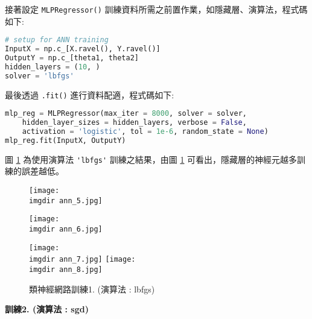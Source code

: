 接著設定 \verb|MLPRegressor()| 訓練資料所需之前置作業，如隱藏層、演算法，程式碼如下:
\bigskip
\begin{lstlisting}[language = Python]
# setup for ANN training
InputX = np.c_[X.ravel(), Y.ravel()]
OutputY = np.c_[theta1, theta2]
hidden_layers = (10, )
solver = 'lbfgs' 
\end{lstlisting}

最後透過 \verb|.fit()| 進行資料配適，程式碼如下:
\bigskip
\begin{lstlisting}[language = Python]
mlp_reg = MLPRegressor(max_iter = 8000, solver = solver,
    hidden_layer_sizes = hidden_layers, verbose = False,
    activation = 'logistic', tol = 1e-6, random_state = None)
mlp_reg.fit(InputX, OutputY)
\end{lstlisting}

圖 \ref{fig:ann_5} 為使用演算法 \verb|'lbfgs'| 訓練之結果，由圖 \ref{fig:ann_5} 可看出，隱藏層的神經元越多訓練的誤差越低。
\begin{figure}[htbp]
\centering
\begin{minipage}[t]{0.48\textwidth}
\centering
\centerline{\texttt{[image: \\imgdir ann\_5.jpg]}}
\caption*{}
\end{minipage}
\begin{minipage}[t]{0.48\textwidth}
\centering
\centerline{\texttt{[image: \\imgdir ann\_6.jpg]}}
\caption*{}
\end{minipage}
\end{figure}
\begin{figure}[H]
	\centering
	\texttt{[image: \\imgdir ann\_7.jpg]}
	\texttt{[image: \\imgdir ann\_8.jpg]}
	\caption{類神經網路訓練1. (演算法 : lbfgs)}
	 \label{fig:ann_5}
\end{figure}

\textbf{\large 訓練2. (演算法 : sgd)} 

